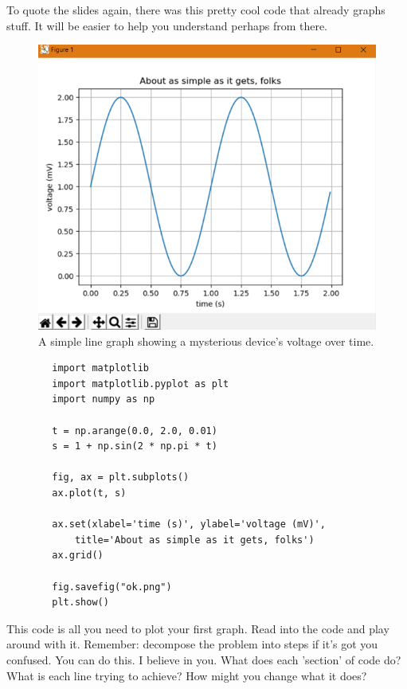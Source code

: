 \documentclass{article}
\begin{document}
    To quote the slides again, there was this pretty cool code that already graphs stuff. It will be easier to help you understand perhaps from there.

    \begin{figure}[H]
        \centering
        \includegraphics[width=\linewidth]{../figures/simple-graph.png}
        \caption{A simple line graph showing a mysterious device's voltage over time.}
        \label{simple-graph}
    \end{figure}

    \begin{lstlisting}
        import matplotlib
        import matplotlib.pyplot as plt
        import numpy as np
        
        t = np.arange(0.0, 2.0, 0.01)
        s = 1 + np.sin(2 * np.pi * t)
        
        fig, ax = plt.subplots()
        ax.plot(t, s)
        
        ax.set(xlabel='time (s)', ylabel='voltage (mV)',
            title='About as simple as it gets, folks')
        ax.grid()
        
        fig.savefig("ok.png")
        plt.show()
    \end{lstlisting}

    This code is all you need to plot your first graph. Read into the code and play around with it. Remember: decompose the problem into steps if it's got you confused. You can do this. I believe in you. What does each 'section' of code do? What is each line trying to achieve? How might you change what it does?
\end{document}
